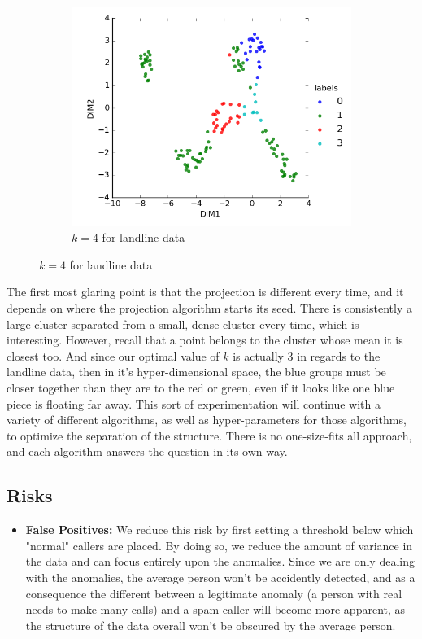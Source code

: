 \documentclass[20pt]{article} %
\begin{document}
\begin{figure}[!htbp]
  	\centering
   	\begin{subfigure}[p]{0.45\linewidth}
    	\includegraphics[width=\linewidth]{../figures/redo/landline/ll_kmeans4.png}
	\caption{$k=4$ for landline data}
   	\end{subfigure}
\end{figure} 

The first most glaring point is that the projection is different every time, and it depends on where the projection algorithm starts its seed.  There is consistently a large cluster separated from a small, dense cluster every time, which is interesting.  However, recall that a point belongs to the cluster whose mean it is closest too.  And since our optimal value of $k$ is actually 3 in regards to the landline data, then in it's hyper-dimensional space, the blue groups must be closer together than they are to the red or green, even if it looks like one blue piece is floating far away.  This sort of experimentation will continue with a variety of different algorithms, as well as hyper-parameters for those algorithms, to optimize the separation of the structure.  There is no one-size-fits all approach, and each algorithm answers the question in its own way.
\subsection{Risks}
\begin{itemize}
\item \textbf{False Positives:} We reduce this risk by first setting a threshold below which "normal" callers are placed.  By doing so, we reduce the amount of variance in the data and can focus entirely upon the anomalies.  Since we are only dealing with the anomalies, the average person won't be accidently detected, and as a consequence the different between a legitimate anomaly (a person with real needs to make many calls) and a spam caller will become more apparent, as the structure of the data overall won't be obscured by the average person.
\end{itemize}
\end{document}
